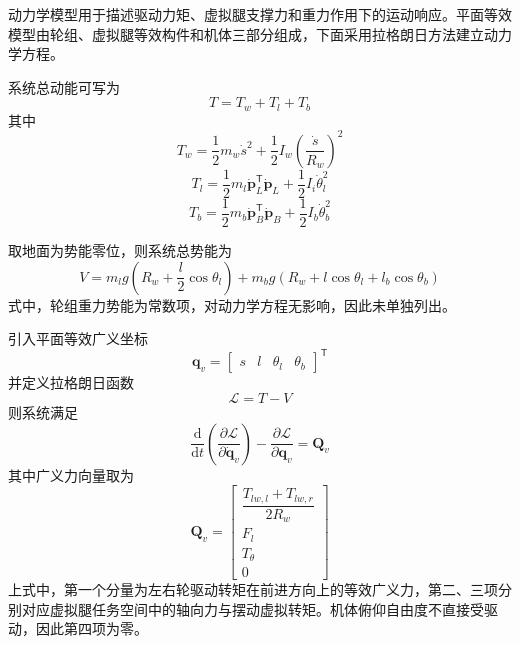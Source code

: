 动力学模型用于描述驱动力矩、虚拟腿支撑力和重力作用下的运动响应。平面等效模型由轮组、虚拟腿等效构件和机体三部分组成，下面采用拉格朗日方法建立动力学方程。

系统总动能可写为
\begin{equation}
  T = T_w + T_l + T_b
  \label{eq:kinetic-total}
\end{equation}
其中
\begin{equation}
  T_w = \frac{1}{2}m_w\dot{s}^2 + \frac{1}{2}I_w\left(\frac{\dot{s}}{R_w}\right)^2
  \label{eq:kinetic-wheel}
\end{equation}
\begin{equation}
  T_l = \frac{1}{2}m_l \dot{\boldsymbol{p}}_L^\mathsf{T}\dot{\boldsymbol{p}}_L + \frac{1}{2}I_i\dot{\theta}_l^2
  \label{eq:kinetic-leg}
\end{equation}
\begin{equation}
  T_b = \frac{1}{2}m_b \dot{\boldsymbol{p}}_B^\mathsf{T}\dot{\boldsymbol{p}}_B + \frac{1}{2}I_b\dot{\theta}_b^2
  \label{eq:kinetic-body}
\end{equation}

取地面为势能零位，则系统总势能为
\begin{equation}
  V = m_l g\left(R_w + \frac{l}{2}\cos\theta_l\right) + m_b g\left(R_w + l\cos\theta_l + l_b\cos\theta_b\right)
  \label{eq:potential-total}
\end{equation}
式中，轮组重力势能为常数项，对动力学方程无影响，因此未单独列出。

引入平面等效广义坐标
\begin{equation}
  \boldsymbol{q}_v =
  \begin{bmatrix}
    s & l & \theta_l & \theta_b
  \end{bmatrix}^{\mathsf{T}}
  \label{eq:generalized-coordinate-v}
\end{equation}
并定义拉格朗日函数
\begin{equation}
  \mathcal{L} = T - V
  \label{eq:lagrangian}
\end{equation}
则系统满足
\begin{equation}
  \frac{\mathrm{d}}{\mathrm{d}t}\left(\frac{\partial \mathcal{L}}{\partial \dot{\boldsymbol{q}}_v}\right)
  -
  \frac{\partial \mathcal{L}}{\partial \boldsymbol{q}_v}
  = \boldsymbol{Q}_v
  \label{eq:lagrange-equation}
\end{equation}
其中广义力向量取为
\begin{equation}
  \boldsymbol{Q}_v =
  \begin{bmatrix}
    \dfrac{T_{lw,l} + T_{lw,r}}{2R_w} \\
    F_l \\
    T_\theta \\
    0
  \end{bmatrix}
  \label{eq:generalized-force}
\end{equation}
上式中，第一个分量为左右轮驱动转矩在前进方向上的等效广义力，第二、三项分别对应虚拟腿任务空间中的轴向力与摆动虚拟转矩。机体俯仰自由度不直接受驱动，因此第四项为零。

